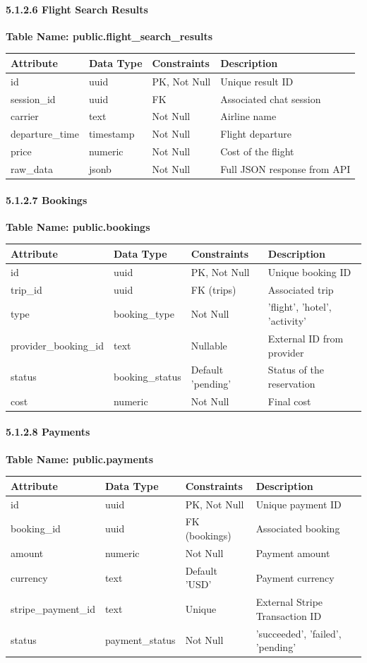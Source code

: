 \documentclass[11pt, a4paper]{article}
\newcommand{\datadictionarytable}[2]{
    \noindent\textbf{Table Name: #1}
    \begin{center}
    \begin{tabularx}{\linewidth}{|l|l|l|X|}
        \hline
        \textbf{Attribute} & \textbf{Data Type} & \textbf{Constraints} & \textbf{Description} \\
        \hline
        #2
    \end{tabularx}
    \end{center}
    \vspace{0.5cm}
}
\begin{document}
\paragraph{5.1.2.6 Flight Search Results}
\datadictionarytable{public.flight\_search\_results}{
    id & uuid & PK, Not Null & Unique result ID \\ \hline
    session\_id & uuid & FK & Associated chat session \\ \hline
    carrier & text & Not Null & Airline name \\ \hline
    departure\_time & timestamp & Not Null & Flight departure \\ \hline
    price & numeric & Not Null & Cost of the flight \\ \hline
    raw\_data & jsonb & Not Null & Full JSON response from API \\ \hline
}

\paragraph{5.1.2.7 Bookings}
\datadictionarytable{public.bookings}{
    id & uuid & PK, Not Null & Unique booking ID \\ \hline
    trip\_id & uuid & FK (trips) & Associated trip \\ \hline
    type & booking\_type & Not Null & 'flight', 'hotel', 'activity' \\ \hline
    provider\_booking\_id & text & Nullable & External ID from provider \\ \hline
    status & booking\_status & Default 'pending' & Status of the reservation \\ \hline
    cost & numeric & Not Null & Final cost \\ \hline
}

\paragraph{5.1.2.8 Payments}
\datadictionarytable{public.payments}{
    id & uuid & PK, Not Null & Unique payment ID \\ \hline
    booking\_id & uuid & FK (bookings) & Associated booking \\ \hline
    amount & numeric & Not Null & Payment amount \\ \hline
    currency & text & Default 'USD' & Payment currency \\ \hline
    stripe\_payment\_id & text & Unique & External Stripe Transaction ID \\ \hline
    status & payment\_status & Not Null & 'succeeded', 'failed', 'pending' \\ \hline
}
\end{document}
